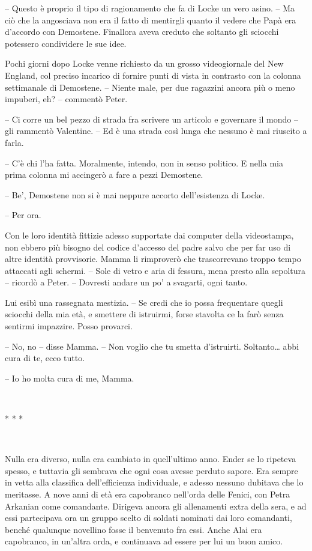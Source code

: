 {-- Questo è proprio il tipo di ragionamento che fa di Locke un vero
	asino. -- Ma ciò che la angosciava non era il fatto di mentirgli quanto
	il vedere che Papà era d'accordo con Demostene. Finallora aveva creduto
	che soltanto gli sciocchi potessero condividere le sue idee.}

{Pochi giorni dopo Locke venne richiesto da un grosso videogiornale del
	New England, col preciso incarico di fornire punti di vista in contrasto
	con la colonna settimanale di Demostene. -- Niente male, per due
	ragazzini ancora più o meno impuberi, eh? -- commentò Peter.}

{-- Ci corre un bel pezzo di strada fra scrivere un articolo e governare
	il mondo -- gli rammentò Valentine. -- Ed è una strada così lunga che
	nessuno è mai riuscito a farla.}

{-- C'è chi l'ha fatta. Moralmente, intendo, non in senso politico. E
	nella mia prima colonna mi accingerò a fare a pezzi Demostene.}

{-- Be', Demostene non si è mai neppure accorto dell'esistenza di
	Locke.}

{-- Per ora.}

{Con le loro identità fittizie adesso supportate dai computer della
	videostampa, non ebbero più bisogno del codice d'accesso del padre salvo
	che per far uso di altre identità provvisorie. Mamma li rimproverò che
	trascorrevano troppo tempo attaccati agli schermi. -- Sole di vetro e
	aria di fessura, mena presto alla sepoltura -- ricordò a Peter. --
	Dovresti andare un po' a svagarti, ogni tanto.}

{Lui esibì una rassegnata mestizia. -- Se credi che io possa frequentare
	quegli sciocchi della mia età, e smettere di istruirmi, forse stavolta
	ce la farò senza sentirmi impazzire. Posso provarci.}

{-- No, no -- disse Mamma. -- Non voglio che tu smetta d'istruirti.
	Soltanto\ldots{} abbi cura di te, ecco tutto.}

{-- Io ho molta cura di me, Mamma.}

{~}

\begin{center}
	{* * *}
\end{center}

{~}

{Nulla era diverso, nulla era cambiato in quell'ultimo anno. Ender se lo
	ripeteva spesso, e tuttavia gli sembrava che ogni cosa avesse perduto
	sapore. Era sempre in vetta alla classifica dell'efficienza individuale,
	e adesso nessuno dubitava che lo meritasse. A nove anni di età era
	capobranco nell'orda delle Fenici, con Petra Arkanian come comandante.
	Dirigeva ancora gli allenamenti extra della sera, e ad essi partecipava
	ora un gruppo scelto di soldati nominati dai loro comandanti, benché
	qualunque novellino fosse il benvenuto fra essi. Anche Alai era
	capobranco, in un'altra orda, e continuava ad essere per lui un buon
	amico.}

